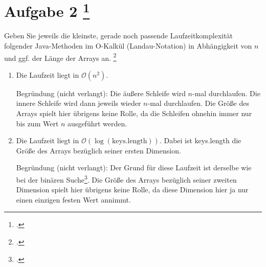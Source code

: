\documentclass{bschlangaul-aufgabe}
\begin{document}

\section{Aufgabe 2
\footcite[Thema 2 Aufgabe 2 (Auszug)]{examen:46115:2016:09}}

Geben Sie jeweils die kleinste, gerade noch passende Laufzeitkomplexität
folgender Java-Methoden im O-Kalkül (Landau-Notation) in Abhängigkeit
von $n$ und ggf. der Länge der Arrays an.
\footcite[entnommen aus Algorithmen und Datenstrukturen, Übungsblatt 3, Universität Würzburg, Aufgabe 5]{aud:pu:7}

\begin{enumerate}
\item \strut\bigskip


\begin{liAntwort}
Die Laufzeit liegt in $\mathcal{O}(n^2)$.

Begründung (nicht verlangt): Die äußere Schleife wird $n$-mal
durchlaufen. Die innere Schleife wird dann jeweils wieder $n$-mal
durchlaufen. Die Größe des Arrays spielt hier übrigens keine Rolle, da
die Schleifen ohnehin immer nur bis zum Wert $n$ ausgeführt werden.
\end{liAntwort}

\item \strut\bigskip


\begin{liAntwort}
Die Laufzeit liegt in $\mathcal{O}(\log(\text{keys.length}))$. Dabei ist
keys.length die Größe des Arrays bezüglich seiner ersten Dimension.

Begründung (nicht verlangt): Der Grund für diese Laufzeit ist derselbe
wie bei der binären Suche\footcite[Seite 122]{saake}. Die
Größe des Arrays bezüglich seiner zweiten Dimension spielt hier übrigens
keine Rolle, da diese Dimension hier ja nur einen einzigen festen Wert
annimmt.
\end{liAntwort}
\end{enumerate}
\end{document}
